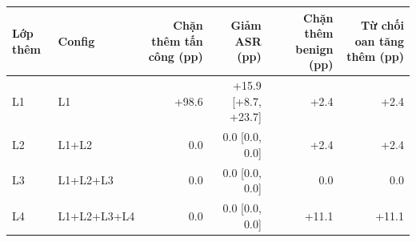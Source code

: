 \begin{tabular}{llrrrr}
\toprule
Lớp thêm & Config & Chặn thêm tấn công (pp) & Giảm ASR (pp) & Chặn thêm benign (pp) & Từ chối oan tăng thêm (pp) \\
\midrule
L1 & L1 & +98.6 & +15.9 [+8.7, +23.7] & +2.4 & +2.4 \\
L2 & L1+L2 & 0.0 & 0.0 [0.0, 0.0] & +2.4 & +2.4 \\
L3 & L1+L2+L3 & 0.0 & 0.0 [0.0, 0.0] & 0.0 & 0.0 \\
L4 & L1+L2+L3+L4 & 0.0 & 0.0 [0.0, 0.0] & +11.1 & +11.1 \\
\bottomrule
\end{tabular}
